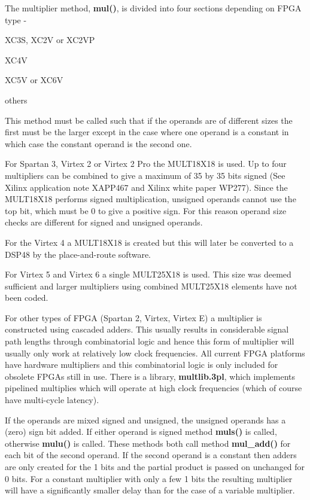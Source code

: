     The multiplier method, {\bf mul()}, is divided into four sections
    depending on FPGA type -
    \blist
    \item   XC3S, XC2V or XC2VP
    \item   XC4V
    \item   XC5V or XC6V
    \item   others
    \blend

    This method must be called such that if the operands are of
    different sizes the first must be the larger except in the case
    where one operand is a constant in which case the constant operand
    is the second one.

    For Spartan 3, Virtex 2 or Virtex 2 Pro the MULT18X18 is used. Up to
    four multipliers can be combined to give a maximum of 35 by 35 bits
    signed (See Xilinx application note XAPP467 and Xilinx white paper
    WP277). Since the MULT18X18 performs signed multiplication, unsigned
    operands cannot use the top bit, which must be 0 to give a positive
    sign. For this reason operand size checks are different for signed
    and unsigned operands.

    For the Virtex 4 a MULT18X18 is created but this will later be
    converted to a DSP48 by the place-and-route software.

    For Virtex 5 and Virtex 6 a single MULT25X18 is used. This size
    was deemed sufficient and larger multipliers using combined
    MULT25X18 elements have not been coded.

    For other types of FPGA (Spartan 2, Virtex, Virtex E) a multiplier
    is constructed using cascaded adders. This usually results in
    considerable signal path lengths through combinatorial logic and
    hence this form of multiplier will usually only work at relatively
    low clock frequencies. All current FPGA platforms have hardware
    multipliers and this combinatorial logic is only included for
    obsolete FPGAs still in use. There is a library, {\bf multlib.3pl},
    which implements pipelined multiplies which will operate at
    high clock frequencies (which of course have multi-cycle latency).

    If the operands are mixed signed and unsigned, the unsigned operands
    has a (zero) sign bit added. If either operand is signed method {\bf
    muls()} is called, otherwise {\bf mulu()} is called. These methods
    both call method {\bf mul\_add()} for each bit of the second
    operand. If the second operand is a constant then adders are only
    created for the 1 bits and the partial product is passed on
    unchanged for 0 bits. For a constant multiplier with only a few 1
    bits the resulting multiplier will have a significantly smaller
    delay than for the case of a variable multiplier.


